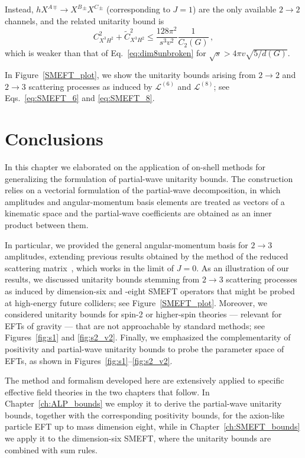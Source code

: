 Instead, $h X^A{}^\mp \to X^B{}^\pm X^C{}^\pm$ (corresponding to $J=1$) are the only available $2\to 2$ channels, and the related unitarity bound is
%
\begin{equation}
    C_{X^3H^2}^2+\widetilde C_{X^3H^2}^2 \le 
    \frac{128\pi^2}{s^3 v^2}
    \frac{1}{C_2(G)}\,,
\end{equation}
which is weaker than that of Eq.~\eqref{eq:dim8unbroken} for $\sqrt{s} > 4\pi v\sqrt{5/d(G)}$.

In Figure~\ref{SMEFT_plot}, we show the unitarity bounds 
arising from $2\to 2$ and $2\to 3$ scattering processes as induced 
by $\mathcal L^{(6)}$ and $\mathcal L^{(8)}$; see 
Eqs.~\eqref{eq:SMEFT_6} and \eqref{eq:SMEFT_8}.

\section{Conclusions\label{sec:PWUBconclusions}}

In this chapter we elaborated on the application of on-shell methods for generalizing the formulation of partial-wave unitarity bounds. The construction relies on a vectorial formulation of the partial-wave decomposition, in which
amplitudes and angular-momentum basis elements are treated as vectors of a kinematic space and the
partial-wave coefficients are obtained as an inner product between them.

In particular, we provided the general angular-momentum basis for $2 \to 3$ amplitudes, extending previous results obtained by the method of the reduced scattering matrix~\cite{Chang:2019vez,Falkowski:2019tft,Cohen:2021ucp,Mahmud:2025wye}, which works in the limit of $J=0$.
As an illustration of our results, we discussed unitarity bounds stemming from $2 \to 3$ scattering processes as induced by dimension-six and -eight SMEFT operators that might be probed at high-energy future colliders; see Figure~\ref{SMEFT_plot}.
Moreover, we considered unitarity bounds for spin-2 or higher-spin theories --- relevant for EFTs of gravity --- that are not approachable by standard methods; see Figures~\ref{fig:s1} and \ref{fig:s2_v2}. 
Finally, we emphasized the complementarity of positivity and partial-wave unitarity bounds to probe the parameter space of EFTs, as shown in Figures~\ref{fig:s1}--\ref{fig:s2_v2}.

The method and formalism developed here are extensively applied to specific effective field theories in the two chapters that
follow. In Chapter~\ref{ch:ALP_bounds} we employ it to derive the partial-wave unitarity bounds,
together with the corresponding positivity bounds, for the axion-like particle EFT up to mass
dimension eight, while in Chapter~\ref{ch:SMEFT_bounds} we apply it to the dimension-six SMEFT, where
the unitarity bounds are combined with sum rules.

\begin{subappendices}

\end{subappendices}